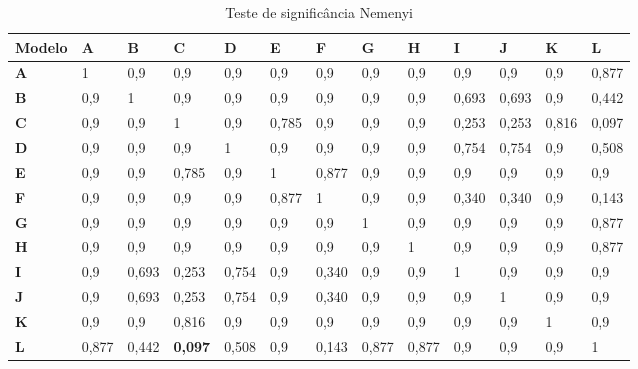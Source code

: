 \begin{table}[!htb]
	\caption{Teste de significância Nemenyi}\label{tb:nemenyi}
	\centering
	\small
	\setlength{\tabcolsep}{4pt} %
\begin{tabular}{@{}lllllllllllll@{}}
	\toprule
	\textbf{Modelo} & \textbf{A} & \textbf{B} & \textbf{C}     & \textbf{D} & \textbf{E} & \textbf{F} & \textbf{G} & \textbf{H} & \textbf{I} & \textbf{J} & \textbf{K} & \textbf{L} \\ \midrule
	\textbf{A}       & 1          & 0,9        & 0,9            & 0,9        & 0,9        & 0,9        & 0,9        & 0,9        & 0,9        & 0,9        & 0,9        & 0,877      \\
	\textbf{B}       & 0,9        & 1          & 0,9            & 0,9        & 0,9        & 0,9        & 0,9        & 0,9        & 0,693      & 0,693      & 0,9        & 0,442      \\
	\textbf{C}       & 0,9        & 0,9        & 1              & 0,9        & 0,785      & 0,9        & 0,9        & 0,9        & 0,253      & 0,253      & 0,816      & 0,097      \\
	\textbf{D}       & 0,9        & 0,9        & 0,9            & 1          & 0,9        & 0,9        & 0,9        & 0,9        & 0,754      & 0,754      & 0,9        & 0,508      \\
	\textbf{E}       & 0,9        & 0,9        & 0,785          & 0,9        & 1          & 0,877      & 0,9        & 0,9        & 0,9        & 0,9        & 0,9        & 0,9        \\
	\textbf{F}       & 0,9        & 0,9        & 0,9            & 0,9        & 0,877      & 1          & 0,9        & 0,9        & 0,340      & 0,340      & 0,9        & 0,143      \\
	\textbf{G}       & 0,9        & 0,9        & 0,9            & 0,9        & 0,9        & 0,9        & 1          & 0,9        & 0,9        & 0,9        & 0,9        & 0,877      \\
	\textbf{H}       & 0,9        & 0,9        & 0,9            & 0,9        & 0,9        & 0,9        & 0,9        & 1          & 0,9        & 0,9        & 0,9        & 0,877      \\
	\textbf{I}       & 0,9        & 0,693      & 0,253          & 0,754      & 0,9        & 0,340      & 0,9        & 0,9        & 1          & 0,9        & 0,9        & 0,9        \\
	\textbf{J}       & 0,9        & 0,693      & 0,253          & 0,754      & 0,9        & 0,340      & 0,9        & 0,9        & 0,9        & 1          & 0,9        & 0,9        \\
	\textbf{K}       & 0,9        & 0,9        & 0,816          & 0,9        & 0,9        & 0,9        & 0,9        & 0,9        & 0,9        & 0,9        & 1          & 0,9        \\
	\textbf{L}       & 0,877      & 0,442      & \textbf{0,097} & 0,508      & 0,9        & 0,143      & 0,877      & 0,877      & 0,9        & 0,9        & 0,9        & 1          \\ \bottomrule
\end{tabular}
	

\end{table}

